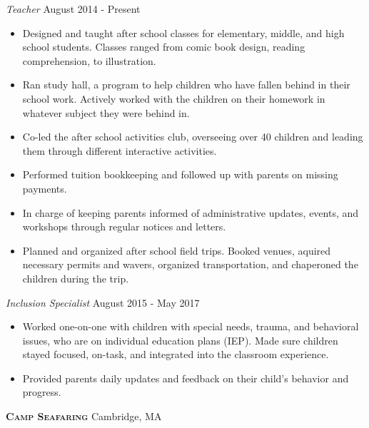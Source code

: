 \documentclass[a4paper]{article}
\begin{document}
\begin{addmargin}[1em]{0em}
    \textit{Teacher} \hfill August 2014 - Present\\
    \vspace{-1mm}
    \begin{itemize} \itemsep 1pt
        \item Designed and taught after school classes for elementary, middle, and high 
            school students. Classes ranged from comic book design, reading comprehension,
            to illustration.
        \item Ran study hall, a program to help children who have fallen behind in their
            school work. Actively worked with the children on their homework in whatever
            subject they were behind in.
        \item Co-led the after school activities club, overseeing over 40 children and leading
            them through different interactive activities.
        \item Performed tuition bookkeeping and followed up with parents on
            missing payments.
        \item In charge of keeping parents informed of administrative updates, events,
            and workshops through regular notices and letters.
        \item Planned and organized after school field trips. Booked venues, aquired 
            necessary permits and wavers, organized transportation, and chaperoned the
            children during the trip.
        
        
    \end{itemize}
    \textit{Inclusion Specialist} \hfill August 2015 - May 2017\\
    \vspace{-1mm}
    \begin{itemize} \itemsep 1pt
        \item Worked one-on-one with children with special needs, trauma, and behavioral
            issues, who are on individual education plans (IEP). Made sure children stayed
            focused, on-task, and integrated into the classroom experience.
        \item Provided parents daily updates and feedback on their child's behavior and
            progress.

    \end{itemize}
\end{addmargin}

\textbf{\textsc{Camp Seafaring}} \hfill Cambridge, MA\\
\vspace{2mm}
\end{document}
